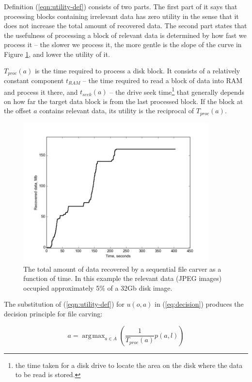 \documentclass[final,5p,times,twocolumn,authoryear]{elsarticle}
\DeclareMathOperator*{\argmax}{\arg\!\max}
\begin{document}
Definition (\ref{eqn:utility-def}) consists of two parts. The first part of it says that processing blocks containing irrelevant data has zero utility in the sense that it does not increase the total amount of recovered data. The second part states that the usefulness of processing a block of relevant data is determined by how fast we process it -- the slower we process it, the more gentle is the slope of the curve in Figure \ref{fig:sequential}, and lower the utility of it. 

$T_{proc}(a)$ is the time required to process a disk block. It consists of a relatively constant component $t_{RAM}$ -- the time required to read a block of data into RAM and process it there, and $t_{seek}(a)$ -- the drive seek time\footnote{the time taken for a disk drive to locate the area on the disk where the data to be read is stored.} that generally depends on how far the target data block is from the last processed block. If the block at the offset $a$ contains relevant data, its utility is the reciprocal of $T_{proc}(a)$.

\begin{figure}
	\center
	\includegraphics[width=0.9\textwidth]{wc_fig}
	\caption{The total amount of data recovered by a sequential file carver as a function of time. In this example the relevant data (JPEG images) occupied approximately 5\% of a 32Gb disk image.}
	\label{fig:sequential}
\end{figure}

The substitution of (\ref{eqn:utility-def}) for $u(o,a)$ in (\ref{eq:decision}) produces the decision principle for file carving:

\begin{equation} \label{eq:carving-decision}
a = \argmax_{a \in A} \left( \frac{1}{T_{proc}(a)} p(a,l)\right)
\end{equation}
\end{document}
